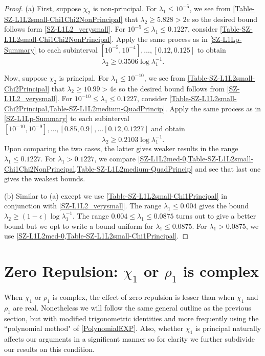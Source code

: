 \documentclass[12pt,psamsfonts]{amsart}
\theoremstyle{definition}
\theoremstyle{remark}
\numberwithin{equation}{section}
\begin{document}
\begin{proof} (a) First, suppose $\chi_2$ is non-principal. For $\lambda_1 \leq 10^{-5}$, we see from \cref{Table-SZ-L1L2small-Chi1Chi2NonPrincipal} that $\lambda_2 \geq 5.828 > 2e$ so the desired bound follows form \cref{SZ-L1L2_verysmall}.  For $10^{-5} \leq \lambda_1 \leq 0.1227$, consider \cref{Table-SZ-L1L2small-Chi1Chi2NonPrincipal}. Apply the same process as in \cref{SZ-L1Lp-Summary} to each subinterval $[10^{-5}, 10^{-4}],  \dots, [0.12, 0.125]$ to obtain 
\[
\lambda_2 \geq 0.3506 \log \lambda_1^{-1}. 
\]

Now, suppose $\chi_2$ is principal. For $\lambda_1 \leq 10^{-10}$, we see from \cref{Table-SZ-L1L2small-Chi2Principal} that $\lambda_2 \geq 10.99 > 4e$ so the desired bound follows from \cref{SZ-L1L2_verysmall}. For $10^{-10} \leq \lambda_1 \leq 0.1227$, consider \cref{Table-SZ-L1L2small-Chi2Principal,Table-SZ-L1L2medium-QuadPrincip}. Apply the same process as in \cref{SZ-L1Lp-Summary} to  each subinterval $[10^{-10}, 10^{-9}],  \dots, [0.85,0.9],\dots [0.12, 0.1227]$ and obtain
\[
\lambda_2 \geq 0.2103 \log \lambda_1^{-1}.
\]
Upon comparing the two cases, the latter gives weaker results in the range $\lambda_1 \leq 0.1227$. For $\lambda_1 > 0.1227$, we compare \cref{SZ-L1L2med-0,Table-SZ-L1L2small-Chi1Chi2NonPrincipal,Table-SZ-L1L2medium-QuadPrincip} and see that  last one gives the weakest bounds.

\noindent
(b) Similar to (a) except we use \cref{Table-SZ-L1L2small-Chi1Principal} in conjunction with \cref{SZ-L1L2_verysmall}. The range $\lambda_1 \leq 0.004$ gives the bound $\lambda_2 \geq (1-\epsilon)\log \lambda_1^{-1}$. The range $0.004 \leq \lambda_1 \leq 0.0875$ turns out to give a better bound but we opt to write a bound uniform for $\lambda_1 \leq 0.0875$. For $\lambda_1 > 0.0875$, we use \cref{SZ-L1L2med-0,Table-SZ-L1L2small-Chi1Principal}. 
\end{proof}



\section{Zero Repulsion: $\chi_1$ or $\rho_1$ is complex}
\label{CC-ZeroRepulsion}
When $\chi_1$ or $\rho_1$ is complex, the effect of zero repulsion is lesser than when $\chi_1$ and $\rho_1$ are real. Nonetheless we will follow the same general outline as the previous section, but with modified trigonometric identities and more frequently using the ``polynomial method" of \cref{PolynomialEXP}. Also, whether $\chi_1$ is principal naturally affects our arguments in a significant manner so for clarity we further subdivide our results on this condition. 
\end{document}
